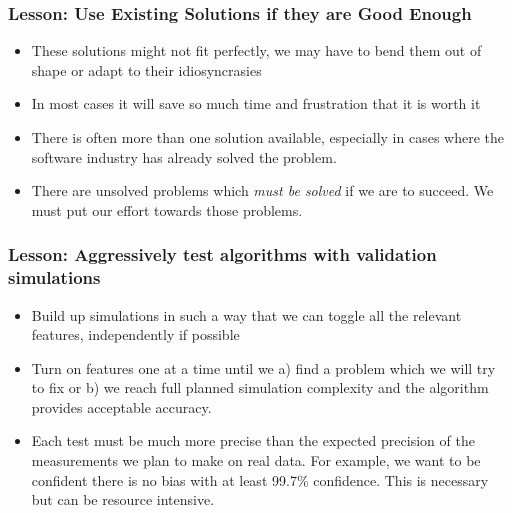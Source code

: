 \documentclass{beamer}
\begin{document}
\frame
{
    \frametitle{Lesson: Use Existing Solutions if they are Good Enough}


    \begin{itemize}

        \item These solutions might not fit perfectly, we may have to bend
            them out of shape or adapt to their idiosyncrasies

        \item In most cases it will save so much time and frustration that it
            is worth it

        \item There is often more than one solution available, especially in
            cases where the software industry has already solved the problem.

        \item There are unsolved problems which {\em must be solved} if we are
            to succeed.  We must put our effort towards those problems.

    \end{itemize}

}

\frame
{
    \frametitle{Lesson: Aggressively test algorithms with validation simulations}


    \begin{itemize}

        \item Build up simulations in such a way that we can toggle all the
            relevant features, independently if possible

        \item Turn on features one at a time until we a) find a problem which we
            will try to fix or b) we reach full planned simulation complexity
            and the algorithm provides acceptable accuracy.

        \item Each test must be much more precise than the expected precision
            of the measurements we plan to make on real data.  For example, we
            want to be confident there is no bias with at least 99.7\%
            confidence.  This is necessary but can be resource intensive.

    \end{itemize}

}
\end{document}

